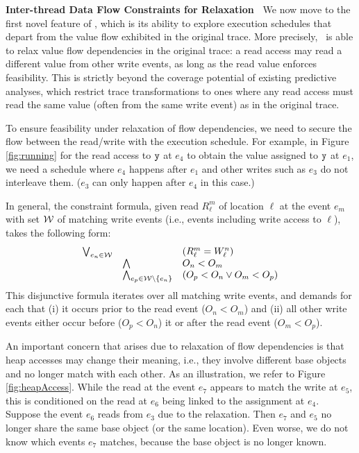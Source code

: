 {\bf Inter-thread Data Flow Constraints for Relaxation\ } We now move to the first novel feature of \tool, which is its ability to explore execution schedules that depart from the value flow exhibited in the original trace. More precisely, \tool\ is able to relax value flow dependencies in the original trace:  a read access may read a
different value from other write events, as long as the read value enforces feasibility.
 This is strictly beyond the coverage potential of existing predictive analyses, which restrict trace transformations to ones where any read access must read the same  value (often from the same write event) as in the original trace. 

To ensure feasibility under relaxation of flow dependencies, we need to secure the flow between the read/write with the execution schedule. 
For example, in Figure \ref{fig:running} for the read access to ${\tt y}$ at $e_4$ to obtain the value assigned to ${\tt y}$ at $e_1$, we need a schedule where 
$e_4$ happens after $e_1$ and other writes such as $e_3$ do not interleave them. ($e_3$ can only happen after $e_4$ in this case.)



In general, the constraint formula, given read $R^{m}_{\ell}$ of location $\ell$ at the event $e_m$ with set ${\cal W}$ of matching write events (i.e., events including write access to $\ell$), takes the following form:
$$
\begin{array}{rll}
\bigvee_{e_n \in {\cal W}} &  & (R^{m}_{\ell} = W^{n}_{\ell}) \\
&		\bigwedge 	&  O_n < O_m \\
&		\bigwedge_{e_p \in {\cal W} \setminus \{ e_n \}} & (O_p < O_n \vee O_m < O_p)
\end{array}
$$
This disjunctive formula iterates over all matching write events, and demands for each that (i) it occurs prior to the read event ($O_n < O_m$) and (ii) all other write events either occur before ($O_p < O_n$) it or after the read event
($O_m < O_p$).

An important concern that arises due to relaxation of flow dependencies is that heap accesses may change their meaning, i.e., they involve different base objects and no longer match with each other. As an illustration, we refer to Figure \ref{fig:heapAccess}. While the read at the event $e_7$ appears to match the write at $e_5$, this is conditioned on the read at $e_6$ being linked to the assignment at $e_4$. Suppose  the event $e_6$ reads from $e_3$ due to the relaxation. Then $e_7$ and $e_5$ no longer share the same base object (or the same location). Even worse, we do not know which events $e_7$ matches, because the base object is no longer known.



